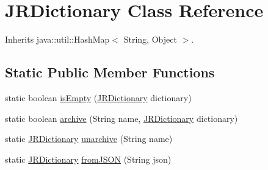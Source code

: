 \hypertarget{classcom_1_1janrain_1_1android_1_1engage_1_1types_1_1_j_r_dictionary}{
\section{JRDictionary Class Reference}
\label{classcom_1_1janrain_1_1android_1_1engage_1_1types_1_1_j_r_dictionary}
}


Inherits java::util::HashMap$<$ String, Object $>$.

\subsection*{Static Public Member Functions}
\begin{DoxyCompactItemize}
\item 
static boolean \hyperlink{classcom_1_1janrain_1_1android_1_1engage_1_1types_1_1_j_r_dictionary_a9f1e3128dfb718f3c73be956f1c9fa63}{isEmpty} (\hyperlink{classcom_1_1janrain_1_1android_1_1engage_1_1types_1_1_j_r_dictionary}{JRDictionary} dictionary)
\item 
static boolean \hyperlink{classcom_1_1janrain_1_1android_1_1engage_1_1types_1_1_j_r_dictionary_a9da45b437f058b058faa379845793cb0}{archive} (String name, \hyperlink{classcom_1_1janrain_1_1android_1_1engage_1_1types_1_1_j_r_dictionary}{JRDictionary} dictionary)
\item 
static \hyperlink{classcom_1_1janrain_1_1android_1_1engage_1_1types_1_1_j_r_dictionary}{JRDictionary} \hyperlink{classcom_1_1janrain_1_1android_1_1engage_1_1types_1_1_j_r_dictionary_a353f92c749fdf6380325de3c8a130142}{unarchive} (String name)
\item 
static \hyperlink{classcom_1_1janrain_1_1android_1_1engage_1_1types_1_1_j_r_dictionary}{JRDictionary} \hyperlink{classcom_1_1janrain_1_1android_1_1engage_1_1types_1_1_j_r_dictionary_a6d1e53c79bf2c04fa81079f01b301016}{fromJSON} (String json)
\end{DoxyCompactItemize}

